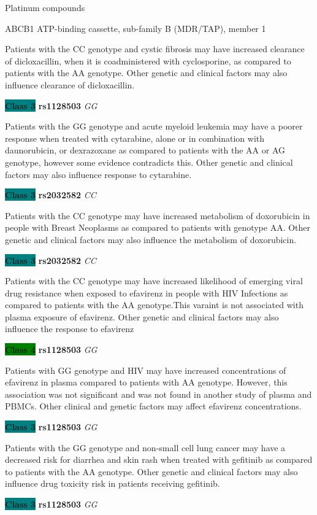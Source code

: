 \documentclass{resume} %
\begin{document}
\begin{rSection}{ Platinum compounds }
\begin{rSubsection}{ ABCB1 }{ ATP-binding cassette, sub-family B (MDR/TAP), member 1 }{}{}
\item[] Patients with the CC genotype and cystic fibrosis may have increased clearance of dicloxacillin, when it is coadministered with cyclosporine, as compared to patients with the AA genotype. Other genetic and clinical factors may also influence clearance of dicloxacillin.\item \textbf{\colorbox{teal} {Class 3}} \textbf{ rs1128503 } \textit{ GG }
\item[] Patients with the GG genotype and acute myeloid leukemia may have a poorer response when treated with cytarabine, alone or in combination with daunorubicin, or dexrazoxane as compared to patients with the AA or AG genotype, however some evidence contradicts this. Other genetic and clinical factors may also influence response to cytarabine.\item \textbf{\colorbox{teal} {Class 3}} \textbf{ rs2032582 } \textit{ CC }
\item[] Patients with the  CC genotype may have increased metabolism of doxorubicin in people with Breast Neoplasms as compared to patients with genotype AA. Other genetic and clinical factors may also influence the metabolism of doxorubicin.\item \textbf{\colorbox{teal} {Class 3}} \textbf{ rs2032582 } \textit{ CC }
\item[] Patients with the CC genotype may have increased likelihood of emerging viral drug resistance when exposed to efavirenz in people with HIV Infections as compared to patients with the AA genotype.This varaint is not associated with plasma exposure of efavirenz. Other genetic and clinical factors may also influence the response to efavirenz\item \textbf{\colorbox{green} {Class 4}} \textbf{ rs1128503 } \textit{ GG }
\item[] Patients with GG genotype and HIV may have increased concentrations of efavirenz in plasma compared to patients with AA genotype. However, this association was not significant and was not found in another study of plasma and PBMCs.  Other clinical and genetic factors may affect efavirenz concentrations.\item \textbf{\colorbox{teal} {Class 3}} \textbf{ rs1128503 } \textit{ GG }
\item[] Patients with the GG genotype and non-small cell lung cancer may have a decreased risk for diarrhea and skin rash when treated with gefitinib as compared to patients with the AA genotype. Other genetic and clinical factors may also influence drug toxicity risk in patients receiving gefitinib.\item \textbf{\colorbox{teal} {Class 3}} \textbf{ rs1128503 } \textit{ GG }

\end{rSubsection}
\end{rSection}
\end{document}
